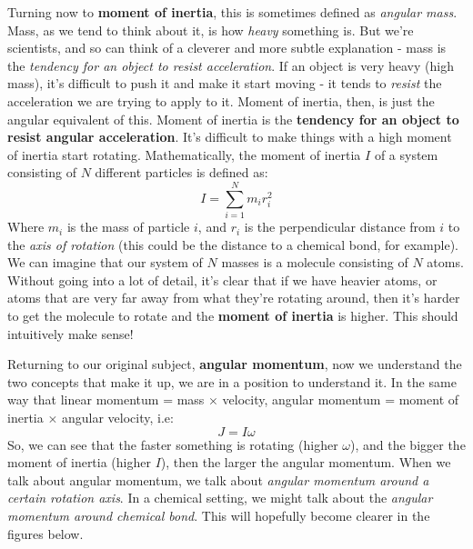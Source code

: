 \documentclass{memoir}[11pt,oneside,a4paper,openany]
\begin{document}
Turning now to \textbf{moment of inertia}, this is sometimes defined as \emph{angular mass}. Mass, as we tend to think about it, is how \emph{heavy} something is. But we're scientists, and so can think of a cleverer and more subtle explanation - mass is the \emph{tendency for an object to resist acceleration}. If an object is very heavy (high mass), it's difficult to push it and make it start moving - it tends to \emph{resist} the acceleration we are trying to apply to it. Moment of inertia, then, is just the angular equivalent of this. Moment of inertia is the \textbf{tendency for an object to resist angular acceleration}. It's difficult to make things with a high moment of inertia start rotating. Mathematically, the moment of inertia $I$ of a system consisting of $N$ different particles is defined as:
\begin{equation}
	I = \sum_{i=1}^N m_ir_i^2
\end{equation}
Where $m_i$ is the mass of particle $i$, and $r_i$ is the perpendicular distance from $i$ to the \emph{axis of rotation} (this could be the distance to a chemical bond, for example). We can imagine that our system of $N$ masses is a molecule consisting of $N$ atoms. Without going into a lot of detail, it's clear that if we have heavier atoms, or atoms that are very far away from what they're rotating around, then it's harder to get the molecule to rotate and the \textbf{moment of inertia} is higher. This should intuitively make sense! 

Returning to our original subject, \textbf{angular momentum}, now we understand the two concepts that make it up, we are in a position to understand it. In the same way that linear momentum = mass $\times$ velocity, angular momentum = moment of inertia $\times$ angular velocity, i.e:
\begin{equation}
	J = I\omega
\end{equation}
So, we can see that the faster something is rotating (higher $\omega$), and the bigger the moment of inertia (higher $I$), then the larger the angular momentum. When we talk about angular momentum, we talk about \emph{angular momentum around a certain rotation axis}. In a chemical setting, we might talk about the \emph{angular momentum around chemical bond}. This will hopefully become clearer in the figures below.
\end{document}
